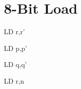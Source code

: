 \section{8-Bit Load}

\begin{instrtable}	

    \begin{instruction}{LD r,r'}
            \FlagsLDr
    \end{instruction}
		
    \begin{instruction}{LD p,p'}
            \FlagsLDr
        \SkipToOpCode
    \end{instruction}

    \begin{instruction}{LD q,q'}
            \FlagsLDr
        \SkipToOpCode
    \end{instruction}

    \begin{instruction}{LD r,n}
            \FlagsLDr
        \SkipToOpCode
    \end{instruction}


\end{instrtable}
